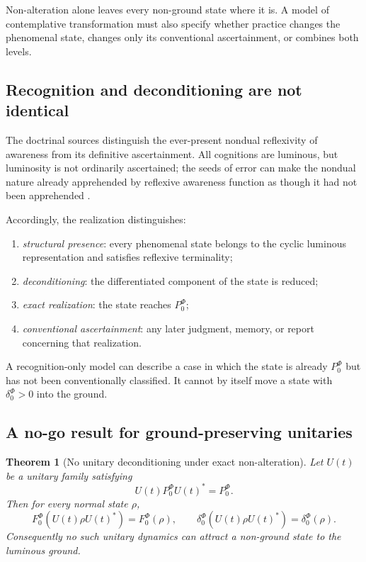 \documentclass[11pt,reqno]{scrartcl}
\newcommand{\PzeroF}{P_{0}^{\Phi}}
\theoremstyle{plain}
\newtheorem{theorem}{Theorem}[section]
\theoremstyle{definition}
\theoremstyle{remark}
\begin{document}
Non-alteration alone leaves every non-ground state where it is.  A model of
contemplative transformation must also specify whether practice changes the
phenomenal state, changes only its conventional ascertainment, or combines
both levels.

\subsection{Recognition and deconditioning are not identical}

The doctrinal sources distinguish the ever-present nondual reflexivity of
awareness from its definitive ascertainment.  All cognitions are luminous,
but luminosity is not ordinarily ascertained; the seeds of error can make the
nondual nature already apprehended by reflexive awareness function as though
it had not been apprehended \cite[pp.~162--163]{Yiannopoulos2012}
\cite[p.~425]{Yiannopoulos2020}.

Accordingly, the realization distinguishes:
\begin{enumerate}[label=(\roman*)]
  \item \emph{structural presence}: every phenomenal state belongs to the
  cyclic luminous representation and satisfies reflexive terminality;
  \item \emph{deconditioning}: the differentiated component of the state is
  reduced;
  \item \emph{exact realization}: the state reaches $\PzeroF$;
  \item \emph{conventional ascertainment}: any later judgment, memory, or
  report concerning that realization.
\end{enumerate}

A recognition-only model can describe a case in which the state is already
$\PzeroF$ but has not been conventionally classified.  It cannot by itself
move a state with $\delta_0^{\Phi}>0$ into the ground.

\subsection{A no-go result for ground-preserving unitaries}

\begin{theorem}[No unitary deconditioning under exact non-alteration]
\label{thm:no-unitary-deconditioning}
Let $U(t)$ be a unitary family satisfying
\begin{equation}
  U(t)\PzeroF U(t)^*=\PzeroF.
\end{equation}
Then for every normal state $\rho$,
\begin{equation}
  F_0^{\Phi}(U(t)\rho U(t)^*)=F_0^{\Phi}(\rho),
  \qquad
  \delta_0^{\Phi}(U(t)\rho U(t)^*)=\delta_0^{\Phi}(\rho).
  \label{eq:unitary-fidelity-invariant}
\end{equation}
Consequently no such unitary dynamics can attract a non-ground state to the
luminous ground.
\end{theorem}
\end{document}
